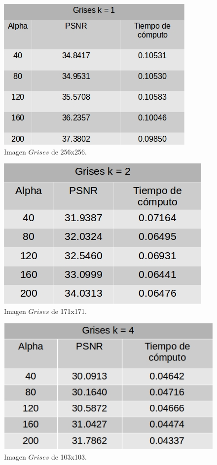 \documentclass[a4paper]{article}
\begin{document}
    \begin{figure}[H]
    \centering
    \includegraphics[scale=0.4]{imagenes/grises1.jpg}
    \caption{Imagen $Grises$ de 256x256.}
	\label{grisese}
    \end{figure}
    
     \begin{figure}[H]
    \centering
    \includegraphics[scale=0.4]{imagenes/grises2.jpg}
    \caption{Imagen $Grises$ de 171x171.}
	\label{grisese}
    \end{figure}
    
     \begin{figure}[H]
    \centering
    \includegraphics[scale=0.4]{imagenes/grises4.jpg}
    \caption{Imagen $Grises$ de 103x103.}
	\label{grisese}
    \end{figure}
    
\end{document}

